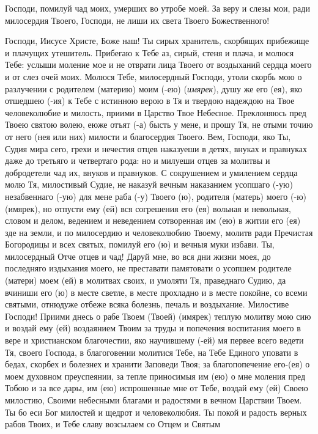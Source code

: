 \mychapterending[1.5]{}


\begin{mymulticols}
 


Господи, помилуй чад моих, умерших во утробе моей. За веру и слезы мои, ради милосердия Твоего, Господи, не лиши их света Твоего Божественного! 

\end{mymulticols}

\mychapterending


\begin{mymulticols}
 


Господи, Иисусе Христе, Боже наш! Ты сирых хранитель, скорбящих прибежище и плачущих утешитель. Прибегаю к Тебе аз, сирый, стеня и плача, и молюся Тебе: услыши моление мое и не отврати лица Твоего от воздыханий сердца моего и от слез очей моих. Молюся Тебе, милосердный Господи, утоли скорбь мою о разлучении с родителем (материю) моим (-ею) ({\itshape имярек}), душу же его (ея), яко отшедшею (-ия) к Тебе с истинною верою в Тя и твердою надеждою на Твое человеколюбие и милость, приими в Царство Твое Небесное. Преклоняюсь пред Твоею святою волею, еюже отъят (-а) бысть у мене, и прошу Тя, не отыми точию от него (нея или них) милости и благосердия Твоего. Вем, Господи, яко Ты, Судия мира сего, грехи и нечестия отцев наказуеши в детях, внуках и правнуках даже до третьяго и четвертаго рода: но и милуеши отцев за молитвы и добродетели чад их, внуков и правнуков. С сокрушением и умилением сердца молю Тя, милостивый Судие, не наказуй вечным наказанием усопшаго (-ую) незабвеннаго (-ую) для мене раба (-у) Твоего (ю), родителя (матерь) моего (-ю) (имярек), но отпусти ему (ей) вся согрешения его (ея) вольная и невольная, словом и делом, ведением и неведением сотворенная им (ею) в житии его (ея) зде на земли, и по милосердию и человеколюбию Твоему, молитв ради Пречистая Богородицы и всех святых, помилуй его (ю) и вечныя муки избави. Ты, милосердный Отче отцев и чад! Даруй мне, во вся дни жизни моея, до последняго издыхания моего, не преставати памятовати о усопшем родителе (матери) моем (ей) в молитвах своих, и умоляти Тя, праведнаго Судию, да вчиниши его (ю) в месте светле, в месте прохладно и в месте покойне, со всеми святыми, отнюдуже отбеже всяка болезнь, печаль и воздыхание. Милостиве Господи! Приими днесь о рабе Твоем (Твоей) (имярек) теплую молитву мою сию и воздай ему (ей) воздаянием Твоим за труды и попечения воспитания моего в вере и христианском благочестии, яко научившему (-ей) мя первее всего ведети Тя, своего Господа, в благоговении молитися Тебе, на Тебе Единого уповати в бедах, скорбех и болезнех и хранити Заповеди Твоя; за благопопечение его-(ея) о моем духовном преуспеянии, за тепле приносимыя им (ею) о мне моления пред Тобою и за все дары, им (ею) испрошенные мне от Тебе, воздай ему (ей) Своею милостию, Своими небесными благами и радостями в вечном Царствии Твоем. Ты бо еси Бог милостей и щедрот и человеколюбия. Ты покой и радость верных рабов Твоих, и Тебе славу возсылаем со Отцем и Святым 
\end{mymulticols}
